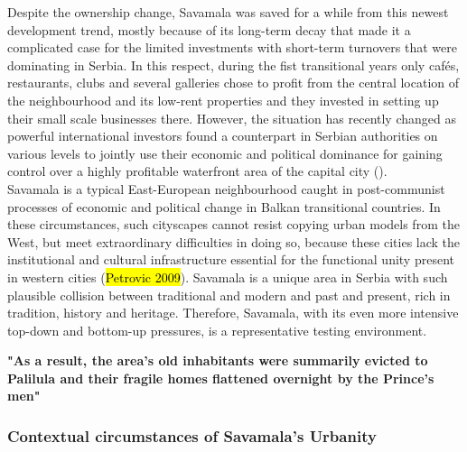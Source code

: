\documentclass[11pt]{report}
\begin{document}
Despite the ownership change, Savamala was saved for a while from this newest development trend, mostly because of its long-term decay that made it a complicated case for the limited investments with short-term turnovers that were dominating in Serbia.
In this respect, during the fist transitional years only cafés, restaurants, clubs and several galleries chose to profit from the central location of the neighbourhood and its low-rent properties and they invested in setting up their small scale businesses there.
However, the situation has recently changed as powerful international investors found a counterpart in Serbian authorities on various levels to jointly use their economic and political dominance for gaining control over a highly profitable waterfront area of the capital city (\cite{Zekovic et al., 2016}).
\\
Savamala is a typical East-European neighbourhood caught in post-communist processes of economic and political change in Balkan transitional countries.
In these circumstances, such cityscapes cannot resist copying urban models from the West, but meet extraordinary difficulties in doing so, because these cities lack the institutional and cultural infrastructure essential for the functional unity present in western cities (\hl{Petrovic 2009}).
Savamala is a unique area in Serbia with such plausible collision between traditional and modern and past and present, rich in tradition, history and heritage.
Therefore, Savamala, with its even more intensive top-down and bottom-up pressures, is a representative testing environment.

\textbf{"As a result, the area's old inhabitants were summarily evicted to Palilula  and their fragile homes flattened overnight by the Prince's men" \cite{bureau savamala}}

\subsubsection{Contextual circumstances of Savamala's Urbanity}
\end{document}
